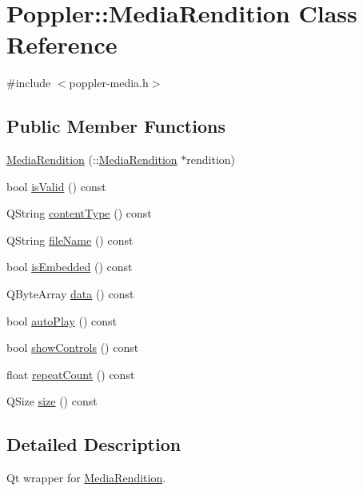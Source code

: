 \hypertarget{class_poppler_1_1_media_rendition}{}\section{Poppler\+:\+:Media\+Rendition Class Reference}
\label{class_poppler_1_1_media_rendition}


{\ttfamily \#include $<$poppler-\/media.\+h$>$}

\subsection*{Public Member Functions}
\begin{DoxyCompactItemize}
\item 
\hyperlink{class_poppler_1_1_media_rendition_abbff4c1b2b2fd57b52ed6bacdf6096e5}{Media\+Rendition} (\+::\hyperlink{class_poppler_1_1_media_rendition}{Media\+Rendition} $\ast$rendition)
\item 
bool \hyperlink{class_poppler_1_1_media_rendition_a12fb03b5ff9738d1ccd846bfd0c1d01e}{is\+Valid} () const
\item 
Q\+String \hyperlink{class_poppler_1_1_media_rendition_a7c426eb89375af3523d986404146fd44}{content\+Type} () const
\item 
Q\+String \hyperlink{class_poppler_1_1_media_rendition_ac926ac98e75a523f08aa1467c184a0d0}{file\+Name} () const
\item 
bool \hyperlink{class_poppler_1_1_media_rendition_a3719041146c801a028b9a8eafbd1b073}{is\+Embedded} () const
\item 
Q\+Byte\+Array \hyperlink{class_poppler_1_1_media_rendition_a0e75d17d368b01007cf2e8deaefe70e8}{data} () const
\item 
bool \hyperlink{class_poppler_1_1_media_rendition_a0eb780fdd27b7e5923d3007d105ec2c3}{auto\+Play} () const
\item 
bool \hyperlink{class_poppler_1_1_media_rendition_a734c35bdd120909ffc307e3086b574d6}{show\+Controls} () const
\item 
float \hyperlink{class_poppler_1_1_media_rendition_af6e8f3ab18c80dd4509e24dc5b049663}{repeat\+Count} () const
\item 
Q\+Size \hyperlink{class_poppler_1_1_media_rendition_ae54aff9bb07fae051ff19befd7854cdb}{size} () const
\end{DoxyCompactItemize}


\subsection{Detailed Description}
Qt wrapper for \hyperlink{class_poppler_1_1_media_rendition}{Media\+Rendition}.

